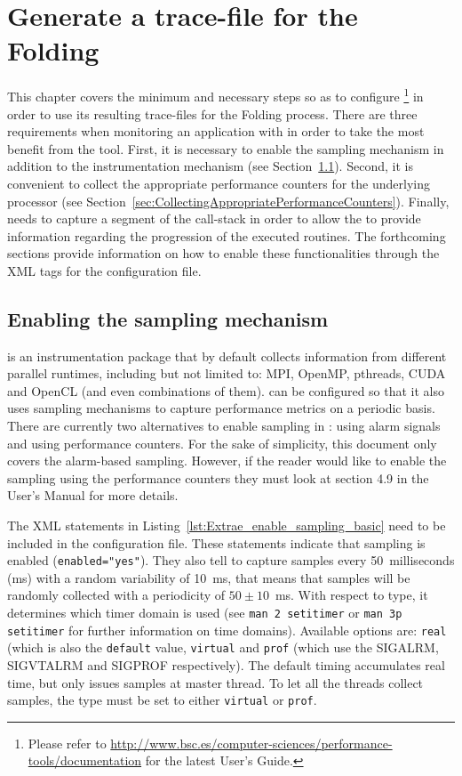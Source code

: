 \chapter{Generate a trace-file for the Folding}\label{cha:GetATrace}

This chapter covers the minimum and necessary steps so as to configure \EXTRAE\footnote{Please refer to \url{http://www.bsc.es/computer-sciences/performance-tools/documentation} for the latest \EXTRAE User's Guide.} in order to use its resulting trace-files for the Folding process.
There are three requirements when monitoring an application with \EXTRAE in order to take the most benefit from the \FOLDING tool. 
First, it is necessary to enable the sampling mechanism in addition to the instrumentation mechanism (see Section~\ref{sec:EnableSamplingMechanism}).
Second, it is convenient to collect the appropriate performance counters for the underlying processor (see Section~\ref{sec:CollectingAppropriatePerformanceCounters}).
Finally, \EXTRAE needs to capture a segment of the call-stack in order to allow the \FOLDING to provide information regarding the progression of the executed routines.
The forthcoming sections provide information on how to enable these functionalities through the XML tags for the \EXTRAE configuration file.

\section{Enabling the sampling mechanism}\label{sec:EnableSamplingMechanism}

\EXTRAE is an instrumentation package that by default collects information from different parallel runtimes, including but not limited to: MPI, OpenMP, pthreads, CUDA and OpenCL (and even combinations of them).
\EXTRAE can be configured so that it also uses sampling mechanisms to capture performance metrics on a periodic basis.
There are currently two alternatives to enable sampling in \EXTRAE: using alarm signals and using performance counters.
For the sake of simplicity, this document only covers the alarm-based sampling.
However, if the reader would like to enable the sampling using the performance counters they must look at section 4.9 in the \EXTRAE User's Manual for more details.



The XML statements in Listing~\ref{lst:Extrae_enable_sampling_basic} need to be included in the \EXTRAE configuration file.
These statements indicate \EXTRAE that sampling is enabled (\texttt{enabled="yes"}).
They also tell \EXTRAE to capture samples every 50~milliseconds (ms) with a random variability of 10~ms, that means that samples will be randomly collected with a periodicity of $50{\pm}10$~ms.
With respect to type, it determines which timer domain is used (see {\tt man 2 setitimer} or {\tt man 3p setitimer} for further information on time domains).
Available options are: {\tt real} (which is also the {\tt default} value, {\tt virtual} and {\tt prof} (which use the SIGALRM, SIGVTALRM and SIGPROF respectively).
The default timing accumulates real time, but only issues samples at master thread.
To let all the threads collect samples, the type must be set to either {\tt virtual} or {\tt prof}.

